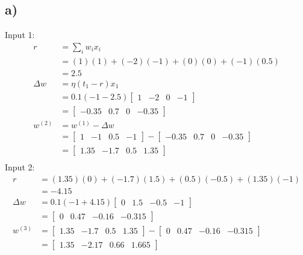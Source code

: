 \documentclass[12pt,a4paper]{article}
\begin{document}
\subsection*{a)}
\label{sub:a_}

Input 1:
\begin{align*}
	r &= \sum_i w_i x_i\\
	&= (1)(1) + (-2)(-1) + (0)(0) + (-1)(0.5)\\
	&= 2.5\\
	\Delta w &= \eta(t_1 - r)x_1\\
	&= 0.1(-1-2.5)\begin{bmatrix}
		1 & -2 & 0 & -1
	\end{bmatrix}\\
	&= \begin{bmatrix}
		-0.35 & 0.7 & 0 & -0.35
	\end{bmatrix}\\
	w^{(2)} &= w^{(1)} - \Delta w\\
	&=
	\begin{bmatrix}
		1 & -1 & 0.5 & -1
	\end{bmatrix} -
	\begin{bmatrix}
		-0.35 & 0.7 & 0 & -0.35
	\end{bmatrix}\\
	&=
	\begin{bmatrix}
		1.35 & -1.7 & 0.5 & 1.35
	\end{bmatrix}\\
\end{align*}
Input 2:
\begin{align*}
	r &= (1.35)(0) + (-1.7)(1.5) + (0.5)(-0.5) + (1.35)(-1)\\
	&= -4.15\\
	\Delta w &= 0.1(-1+4.15)\begin{bmatrix}
		0 & 1.5 & -0.5 & -1
	\end{bmatrix}\\
	&= \begin{bmatrix}
		0 & 0.47 & -0.16 & -0.315
	\end{bmatrix}\\
	w^{(3)} &=
	\begin{bmatrix}
		1.35 & -1.7 & 0.5 & 1.35
	\end{bmatrix} -
	\begin{bmatrix}
		0 & 0.47 & -0.16 & -0.315
	\end{bmatrix}\\
	&=
	\begin{bmatrix}
		1.35 & -2.17 & 0.66 & 1.665
	\end{bmatrix}\\
\end{align*}
\end{document}
